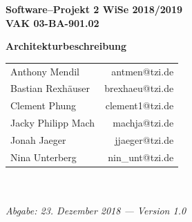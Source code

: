 \documentclass[enabledeprecatedfontcommands,fontsize=11pt,paper=a4,twoside]{scrartcl}
\begin{document}
  \thispagestyle{fancy}
  \fancyhead[LO,RE]{ }
  \fancyfoot[C]{}

  \vspace{3cm}

  \begin{minipage}[H]{\textwidth}
  \begin{center}
  \bf
  \Large
  Software--Projekt 2 WiSe 2018/2019\\
  \smallskip
  \small
  VAK 03-BA-901.02\\
  \vspace{3cm}
  \end{center}
  \end{minipage}
  \begin{minipage}[H]{\textwidth}
  \begin{center}
  \vspace{1cm}
  \bf
  \Large Architekturbeschreibung\\
  \vfill
  \end{center}
  \end{minipage}
  \vfill
  \begin{minipage}[H]{\textwidth}
  \begin{center}
  \sf
  \begin{tabular}{lr}
  Anthony Mendil & antmen@tzi.de \\
  Bastian Rexhäuser & brexhaeu@tzi.de\\
  Clement Phung & clement1@tzi.de \\
  Jacky Philipp Mach & machja@tzi.de \\
  Jonah Jaeger & jjaeger@tzi.de \\
  Nina Unterberg & nin\_unt@tzi.de \\
  \end{tabular}
  \\ ~
  \vspace{2cm}
  \\
  \it Abgabe: 23. Dezember 2018 --- Version 1.0\\ ~
  \end{center}
  \end{minipage}



\newpage
\end{document}

